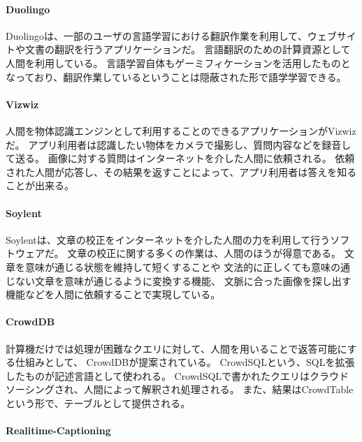 \paragraph{Duolingo}\label{duolingo}

\mbox{}

Duolingo\cite{duolingo}は、一部のユーザの言語学習における翻訳作業を利用して、ウェブサイトや文書の翻訳を行うアプリケーションだ。
言語翻訳のための計算資源として人間を利用している。
言語学習自体もゲーミフィケーションを活用したものとなっており、翻訳作業しているということは隠蔽された形で語学学習できる。

\paragraph{Vizwiz}\label{vizwiz}

\mbox{}

人間を物体認識エンジンとして利用することのできるアプリケーションがVizwiz\cite{vizwiz}だ。
アプリ利用者は認識したい物体をカメラで撮影し、質問内容などを録音して送る。
画像に対する質問はインターネットを介した人間に依頼される。
依頼された人間が応答し、その結果を返すことによって、アプリ利用者は答えを知ることが出来る。

\paragraph{Soylent}\label{soylent}

\mbox{}

Soylent\cite{soylent}は、文章の校正をインターネットを介した人間の力を利用して行うソフトウェアだ。
文章の校正に関する多くの作業は、人間のほうが得意である。
文章を意味が通じる状態を維持して短くすることや
文法的に正しくても意味の通じない文章を意味が通じるように変換する機能、
文脈に合った画像を探し出す機能などを人間に依頼することで実現している。

\paragraph{CrowdDB}\label{crowddb}

\mbox{}

計算機だけでは処理が困難なクエリに対して、人間を用いることで返答可能にする仕組みとして、
CrowdDB\cite{crowddb}が提案されている。
CrowdSQLという、SQLを拡張したものが記述言語として使われる。
CrowdSQLで書かれたクエリはクラウドソーシングされ、人間によって解釈され処理される。
また、結果はCrowdTableという形で、テーブルとして提供される。

\paragraph{Realitime-Captioning}\label{realitime-captioning}

